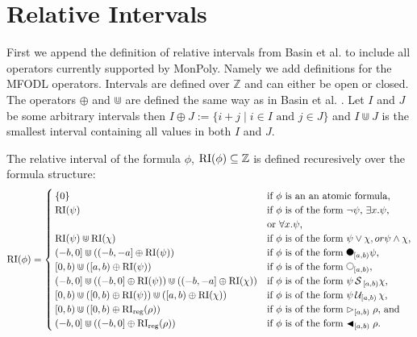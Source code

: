\section{Relative Intervals}

First we append the definition of relative intervals from Basin et al. \cite{Basin2016} to include all operators currently supported by MonPoly.
Namely we add definitions for the MFODL operators.
Intervals are defined over $\mathbb{Z}$ and can either be open or closed.
The operators $\oplus$ and $\Cup$ are defined the same way as in Basin et al. \cite{Basin2016}.
Let $I$ and $J$ be some arbitrary intervals then $I \oplus J := \{i+j \mid i \in I \text{ and } j \in J\}$ and $I \Cup J$ is the smallest interval containing all values in both $I$ and $J$.

\begin{definition} 
    \label{def:rel-int}
    The relative interval of the formula $\phi$, $\operatorname{RI}(\phi) \subseteq \mathbb{Z}$ is defined recuresively over the formula structure: 
    \begin{equation*}
        \RI(\phi) =
        \begin{cases}
            \{0\}     & \text{if $\phi$ is an an atomic formula,} \\ 
            \RI(\psi) & \text{if $\phi$ is of the form $\neg \psi$, 
                                $\exists x.\psi$,} \\ &\text{or $\forall x.\psi$,} \\
            \RI(\psi) \Cup \RI(\chi) & \text{if $\phi$ is of the form $\psi \lor \chi, or
                                            \psi \land \chi$,} \\
            (-b,0] \Cup ((-b,-a] \oplus \RI(\psi)) & \text{if $\phi$ is of the form $\Previous{[a,b)}\psi$,} \\
            [0,b) \Cup ([a,b) \oplus \RI(\psi)) & \text{if $\phi$ is of the form $\Next{[a,b)}$,}\\
            (-b,0] \Cup ((-b,0] \oplus \RI(\psi)) \Cup ((-b,-a] \oplus \RI(\chi)) & \text{if $\phi$ is of the form $\psi \Since{}_{[a,b)} \chi$,} \\
            [0,b) \Cup ([0,b) \oplus \RI(\psi)) \Cup ([a,b) \oplus \RI(\chi)) & \text{if $\phi$ is of the form $\psi \Until{[a,b)} \chi$,} \\
            [0,b) \Cup ([0,b) \oplus \RIr(\rho)) & \text{if $\phi$ is of the form $\Fregex{[a,b)} \rho$, and}\\
            (-b,0] \Cup ((-b,0] \oplus \RIr(\rho)) & \text{if $\phi$ is of the form $\Pregex{[a,b)} \rho$.}\\
        \end{cases}
    \end{equation*}
\end{definition}

